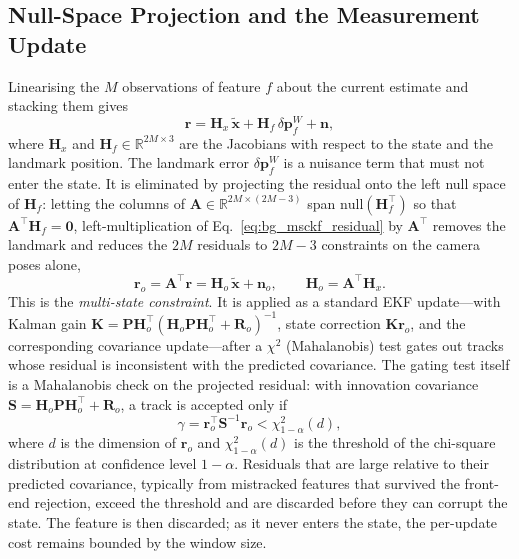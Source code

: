 \subsection{Null-Space Projection and the Measurement Update}
\label{sec:bg_update}
Linearising the $M$ observations of feature $f$ about the current estimate and stacking them gives
\begin{equation}
  \mathbf{r} = \mathbf{H}_{x}\,\tilde{\mathbf{x}} + \mathbf{H}_{f}\,\delta\mathbf{p}_f^{W} + \mathbf{n},
  \label{eq:bg_msckf_residual}
\end{equation}
where $\mathbf{H}_x$ and $\mathbf{H}_f \in \mathbb{R}^{2M \times 3}$ are the Jacobians with respect to the state and the landmark position. The landmark error $\delta\mathbf{p}_f^{W}$ is a nuisance term that must not enter the state. It is eliminated by projecting the residual onto the left null space of $\mathbf{H}_f$: letting the columns of $\mathbf{A} \in \mathbb{R}^{2M \times (2M-3)}$ span $\mathrm{null}(\mathbf{H}_f^{\top})$ so that $\mathbf{A}^{\top}\mathbf{H}_f = \mathbf{0}$, left-multiplication of Eq.~\ref{eq:bg_msckf_residual} by $\mathbf{A}^{\top}$ removes the landmark and reduces the $2M$ residuals to $2M-3$ constraints on the camera poses alone,
\begin{equation}
  \mathbf{r}_o = \mathbf{A}^{\top}\mathbf{r} = \mathbf{H}_o\,\tilde{\mathbf{x}} + \mathbf{n}_o,
  \qquad \mathbf{H}_o = \mathbf{A}^{\top}\mathbf{H}_x.
\end{equation}
This is the \emph{multi-state constraint}. It is applied as a standard EKF update---with Kalman gain $\mathbf{K} = \mathbf{P}\mathbf{H}_o^{\top}(\mathbf{H}_o \mathbf{P} \mathbf{H}_o^{\top} + \mathbf{R}_o)^{-1}$, state correction $\mathbf{K}\mathbf{r}_o$, and the corresponding covariance update---after a $\chi^2$ (Mahalanobis) test gates out tracks whose residual is inconsistent with the predicted covariance. The gating test itself is a Mahalanobis check on the projected residual: with innovation covariance $\mathbf{S} = \mathbf{H}_o\mathbf{P}\mathbf{H}_o^{\top} + \mathbf{R}_o$, a track is accepted only if
\begin{equation}
  \gamma = \mathbf{r}_o^{\top}\mathbf{S}^{-1}\mathbf{r}_o < \chi^2_{1-\alpha}(d),
  \label{eq:bg_chi2}
\end{equation}
where $d$ is the dimension of $\mathbf{r}_o$ and $\chi^2_{1-\alpha}(d)$ is the threshold of the chi-square distribution at confidence level $1-\alpha$. Residuals that are large relative to their predicted covariance, typically from mistracked features that survived the front-end rejection, exceed the threshold and are discarded before they can corrupt the state. The feature is then discarded; as it never enters the state, the per-update cost remains bounded by the window size.


